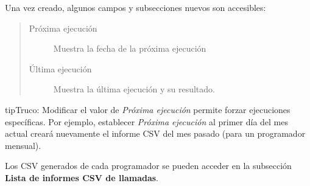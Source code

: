 \documentclass[letterpaper,10pt,spanish]{sphinxmanual}
\begin{document}
Una vez creado, algunos campos y subsecciones nuevos son accesibles:
\begin{quote}
\begin{description}
\item[{Próxima ejecución}] \leavevmode
Muestra la fecha de la próxima ejecución

\item[{Última ejecución}] \leavevmode
Muestra la última ejecución y su resultado.

\end{description}
\end{quote}

\begin{notice}{tip}{Truco:}
Modificar el valor de \emph{Próxima ejecución} permite forzar ejecuciones específicas. Por ejemplo, establecer \emph{Próxima ejecución} al primer día del mes actual creará nuevamente el informe CSV del mes pasado (para un programador mensual).
\end{notice}

Los CSV generados de cada programador se pueden acceder en la subsección \textbf{Lista de informes CSV de llamadas}.
\end{document}
